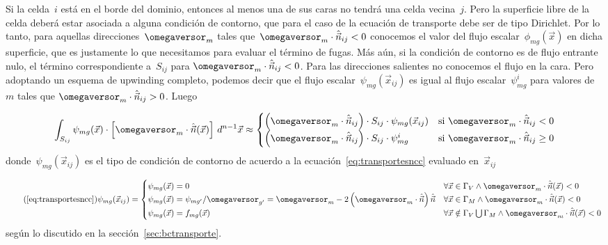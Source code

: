 Si la celda~$i$ está en el borde del dominio, entonces al menos una de sus caras no tendrá una celda vecina~$j$. Pero la superficie libre de la celda deberá estar asociada a alguna condición de contorno, que para el caso de la ecuación de transporte debe ser de tipo Dirichlet. Por lo tanto, para aquellas direcciones~$\omegaversor_m$ tales que~$\omegaversor_m \cdot \hat{\vec{n}}_{ij} < 0$ conocemos el valor del flujo escalar~$\phi_{mg}(\vec{x})$ en dicha superficie, que es justamente lo que necesitamos para evaluar el término de fugas. Más aún, si la condición de contorno es de flujo entrante nulo, el término correspondiente a~$S_{ij}$ para $\omegaversor_m \cdot \hat{\vec{n}}_{ij} < 0$. Para las direcciones salientes  no conocemos el flujo en la cara. Pero adoptando un esquema de upwinding completo, podemos decir que el flujo escalar~$\psi_{mg}(\vec{x}_{ij})$ es igual al flujo escalar~$\psi_{mg}^i$ para valores de~$m$ tales que $\omegaversor_m \cdot \hat{\vec{n}}_{ij} > 0$. Luego

\begin{equation}\label{eq:snvolcc}
 \int_{S_{ij}} \psi_{mg}(\vec{x}) \cdot \left[ \omegaversor_m \cdot \hat{\vec{n}}(\vec{x})\right]  \, d^{n-1}\vec{x}
\approx 
\begin{cases}
\left( \omegaversor_m \cdot \hat{\vec{n}}_{ij}\right) \cdot S_{ij}  \cdot \psi_{mg}(\vec{x}_{ij}) & \text{si $\omegaversor_m \cdot \hat{\vec{n}}_{ij} < 0$} \\
\left( \omegaversor_m \cdot \hat{\vec{n}}_{ij}\right) \cdot S_{ij}  \cdot \psi_{mg}^i & \text{si $\omegaversor_m \cdot \hat{\vec{n}}_{ij} \geq 0$} \\
\end{cases}
\end{equation}
%
donde~$\psi_{mg}(\vec{x}_{ij})$ es el tipo de condición de contorno de acuerdo a la ecuación~\eqref{eq:transportesncc} evaluado en~$\vec{x}_{ij}$

\begin{equation}\tag{\ref{eq:transportesncc}}
\psi_{mg}(\vec{x}_{ij}) =
 \begin{cases}
  \psi_{mg}(\vec{x}) = 0 
& \forall \vec{x} \in \Gamma_V \wedge \omegaversor_m \cdot \hat{\vec{n}}(\vec{x}) < 0 \\
  \psi_{mg}(\vec{x}) = \psi_{mg^\prime} / \omegaversor_{g^\prime} = \omegaversor_m - 2 \left( \omegaversor_m \cdot \hat{\vec{n}} \right) \hat{\vec{n}}
& \forall \vec{x} \in \Gamma_M \wedge \omegaversor_m \cdot \hat{\vec{n}}(\vec{x}) < 0 \\
  \psi_{mg}(\vec{x}) = f_{mg}(\vec{x})
& \forall \vec{x} \notin \Gamma_V \bigcup \Gamma_M \wedge \omegaversor_m \cdot \hat{\vec{n}}(\vec{x}) < 0 \\
 \end{cases}
\end{equation}
%
según lo discutido en la sección~\ref{sec:bctransporte}.


